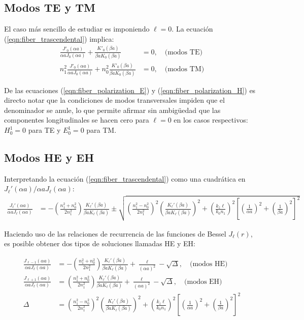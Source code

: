 \subsection{Modos TE y TM}
El caso más sencillo de estudiar es imponiendo $\ell = 0$. La ecuación (\ref{eqn:fiber_trascendental}) implica:
\begin{align*}
	\frac{J'_{0}(\alpha a)}{\alpha a J_0(\alpha a)} + \frac{K'_0(\beta a)}{\beta a K_0(\beta a)}&=  0, \quad \text{(modos TE)}
	\\
	n_1^2\frac{J'_{0}(\alpha a)}{\alpha a J_0(\alpha a)} + n_0^2 \frac{K'_0(\beta a)}{\beta a K_0(\beta a)} &= 0, \quad \text{(modos TM)}
\end{align*}

De las ecuaciones (\ref{eqn:fiber_polarization_E}) y (\ref{eqn:fiber_polarization_H}) es directo notar que la condiciones de modos transversales impiden que el denominador se anule, lo que permite afirmar sin ambigüedad que las componentes longitudinales se hacen cero para $\ell = 0$ en los casos respectivos: $H_0^1 = 0$ para TE y $E_0^1 = 0$ para TM.


\subsection{Modos HE y EH}
Interpretando la ecuación (\ref{eqn:fiber_trascendental}) como una cuadrática en $J_\ell'(\alpha a)/\alpha a J_\ell(\alpha a)$:
\begin{align*}
	\frac{J_\ell'(\alpha a)}{\alpha a J_\ell(\alpha a)} &= -\left(\frac{n_1^2+n_0^2}{2n_1^2}\right) \frac{K_\ell'(\beta a)}{\beta a K_\ell(\beta a)}\pm\sqrt{\left(\frac{n_1^2-n_0^2}{2n_1^2}\right)^2\left(\frac{K_\ell'(\beta a)}{\beta a K_\ell(\beta a)}\right)^2+ \left( \frac{ k_z \ell}{ k_0 n_1} \right)^2\left[ \left(\frac{1}{\alpha a}\right)^2 + \left(\frac{1}{\beta a}\right)^2 \right]^2 }
\end{align*}

Haciendo uso de las relaciones de recurrencia de las funciones de Bessel $J_\ell(r)$,  es posible obtener dos tipos de soluciones llamadas HE y EH:

\begin{align}
		\frac{J_{\ell-1}(\alpha a)}{\alpha a J_\ell(\alpha a)} &= -\left(\frac{n_1^2+n_0^2}{2n_1^2}\right) \frac{K_\ell'(\beta a)}{\beta a K_\ell(\beta a)}+\frac{\ell}{(\alpha a)^2}-\sqrt{\Delta}, \quad \text{(modos HE)}
		\label{eqn:HE}
	\\
		\frac{J_{\ell+1}(\alpha a)}{\alpha a J_\ell(\alpha a)} &= \left(\frac{n_1^2+n_0^2}{2n_1^2}\right) \frac{K_\ell'(\beta a)}{\beta a K_\ell(\beta a)}+\frac{\ell}{(\alpha a)^2}-\sqrt{\Delta}, \quad \text{(modos EH)}
		\label{eqn:EH}
		\\
		\Delta &= \left(\frac{n_1^2-n_0^2}{2n_1^2}\right)^2\left(\frac{K_\ell'(\beta a)}{\beta a K_\ell(\beta a)}\right)^2+ \left( \frac{ k_z \ell}{ k_0 n_1} \right)^2\left[ \left(\frac{1}{\alpha a}\right)^2 + \left(\frac{1}{\beta a}\right)^2 \right]^2 \nonumber
\end{align}



